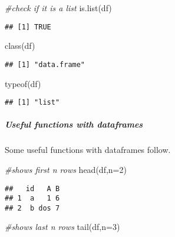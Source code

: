 \documentclass[
]{article}
\newenvironment{Shaded}{\begin{snugshade}}{\end{snugshade}}
\newcommand{\AttributeTok}[1]{\textcolor[rgb]{0.77,0.63,0.00}{#1}}
\newcommand{\CommentTok}[1]{\textcolor[rgb]{0.56,0.35,0.01}{\textit{#1}}}
\newcommand{\DecValTok}[1]{\textcolor[rgb]{0.00,0.00,0.81}{#1}}
\newcommand{\FunctionTok}[1]{\textcolor[rgb]{0.00,0.00,0.00}{#1}}
\newcommand{\NormalTok}[1]{#1}
\begin{document}
\begin{Shaded}
\begin{Highlighting}[]
\CommentTok{\#check if it is a list}
\FunctionTok{is.list}\NormalTok{(df)}
\end{Highlighting}
\end{Shaded}

\begin{verbatim}
## [1] TRUE
\end{verbatim}

\begin{Shaded}
\begin{Highlighting}[]
\FunctionTok{class}\NormalTok{(df)}
\end{Highlighting}
\end{Shaded}

\begin{verbatim}
## [1] "data.frame"
\end{verbatim}

\begin{Shaded}
\begin{Highlighting}[]
\FunctionTok{typeof}\NormalTok{(df)}
\end{Highlighting}
\end{Shaded}

\begin{verbatim}
## [1] "list"
\end{verbatim}

\hypertarget{useful-functions-with-dataframes}{%
\subparagraph{Useful functions with
dataframes}\label{useful-functions-with-dataframes}}

Some useful functions with dataframes follow.

\begin{Shaded}
\begin{Highlighting}[]
\CommentTok{\#shows first n rows}
\FunctionTok{head}\NormalTok{(df,}\AttributeTok{n=}\DecValTok{2}\NormalTok{) }
\end{Highlighting}
\end{Shaded}

\begin{verbatim}
##   id   A B
## 1  a   1 6
## 2  b dos 7
\end{verbatim}

\begin{Shaded}
\begin{Highlighting}[]
\CommentTok{\#shows last n rows}
\FunctionTok{tail}\NormalTok{(df,}\AttributeTok{n=}\DecValTok{3}\NormalTok{)}
\end{Highlighting}
\end{Shaded}
\end{document}
